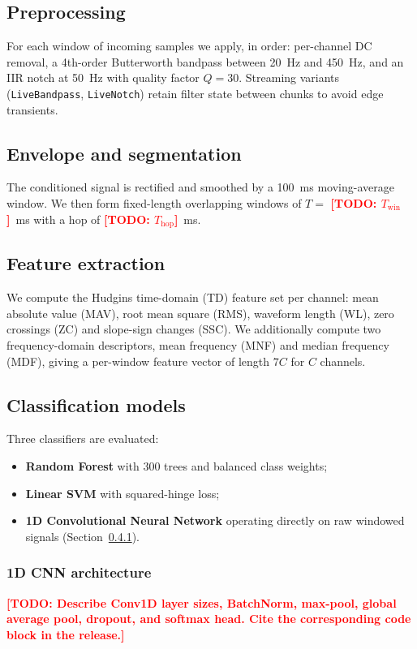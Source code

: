 \documentclass[conference]{IEEEtran}
\newcommand{\todo}[1]{\textcolor{red}{\textbf{[TODO: #1]}}}
\begin{document}
\subsection{Preprocessing}
For each window of incoming samples we apply, in order: per-channel DC
removal, a 4th-order Butterworth bandpass between 20~Hz and 450~Hz, and an
IIR notch at 50~Hz with quality factor $Q=30$. Streaming variants
(\texttt{LiveBandpass}, \texttt{LiveNotch}) retain filter state between
chunks to avoid edge transients.

\subsection{Envelope and segmentation}
The conditioned signal is rectified and smoothed by a 100~ms moving-average
window. We then form fixed-length overlapping windows of $T = $
\todo{$T_{\mathrm{win}}$}~ms with a hop of \todo{$T_{\mathrm{hop}}$}~ms.

\subsection{Feature extraction}
We compute the Hudgins time-domain (TD) feature set per channel:
mean absolute value (MAV), root mean square (RMS), waveform length (WL),
zero crossings (ZC) and slope-sign changes (SSC). We additionally compute
two frequency-domain descriptors, mean frequency (MNF) and median
frequency (MDF), giving a per-window feature vector of length $7C$ for
$C$ channels.

\subsection{Classification models}
Three classifiers are evaluated:
\begin{itemize}
    \item \textbf{Random Forest} with 300 trees and balanced class weights;
    \item \textbf{Linear SVM} with squared-hinge loss;
    \item \textbf{1D Convolutional Neural Network} operating directly on raw windowed signals (Section~\ref{sec:cnn}).
\end{itemize}

\subsubsection{1D CNN architecture}
\label{sec:cnn}
\todo{Describe Conv1D layer sizes, BatchNorm, max-pool, global average
pool, dropout, and softmax head. Cite the corresponding code block in the
release.}
\end{document}
